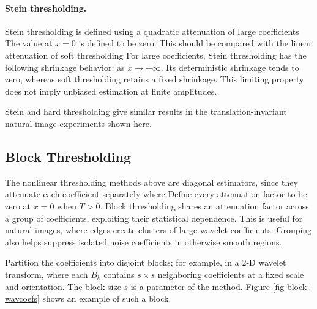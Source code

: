   
\paragraph{Stein thresholding.}

Stein thresholding is defined using a quadratic attenuation of large coefficients
The value at $x=0$ is defined to be zero. This should be compared with the linear attenuation of soft thresholding
For large coefficients, Stein thresholding has the following shrinkage behavior:
as $x \rightarrow \pm \infty$. Its deterministic shrinkage tends to zero, whereas soft thresholding retains a fixed shrinkage. This limiting property does not imply unbiased estimation at finite amplitudes.


Stein and hard thresholding give similar results in the translation-invariant natural-image experiments shown here.

                                                     
\subsection{Block Thresholding}

The nonlinear thresholding methods above are diagonal estimators, since they attenuate each coefficient separately
where 
Define every attenuation factor to be zero at $x=0$ when $T>0$. Block thresholding shares an attenuation factor across a group of coefficients, exploiting their statistical dependence. This is useful for natural images, where edges create clusters of large wavelet coefficients. Grouping also helps suppress isolated noise coefficients in otherwise smooth regions.

Partition the coefficients into disjoint blocks; for example, in a 2-D wavelet transform,
where each $B_k$ contains $s\times s$ neighboring coefficients at a fixed scale and orientation. The block size $s$ is a parameter of the method.
Figure \ref{fig-block-wavcoefs} shows an example of such a block.

